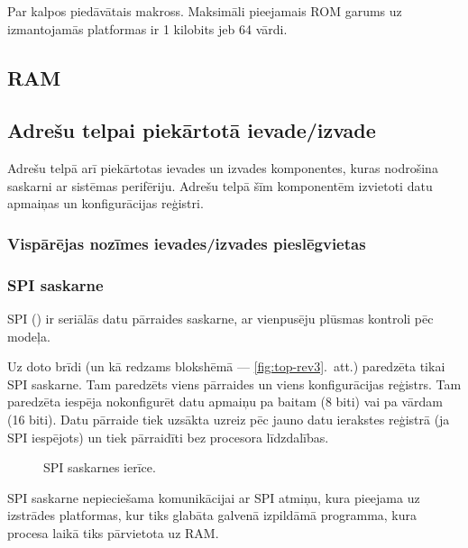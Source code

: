 	Par  kalpos  piedāvātais
	 makross.\cite{FlashROM}
	Maksimāli pieejamais ROM garums uz izmantojamās platformas ir
	1 kilobits jeb 64 vārdi.\cite{FusionGuide}

\subsection{RAM}
	\todo

\subsection{Adrešu telpai piekārtotā ievade/izvade}
	Adrešu telpā arī piekārtotas ievades un izvades komponentes,
	kuras nodrošina saskarni ar sistēmas perifēriju. Adrešu telpā šīm
	komponentēm izvietoti datu apmaiņas un konfigurācijas reģistri.
	
	\subsubsection{Vispārējas nozīmes ievades/izvades pieslēgvietas}
	\todo
	
	\subsubsection{SPI saskarne}
	SPI () ir seriālās
	datu pārraides saskarne, ar vienpusēju plūsmas kontroli pēc
	 modeļa.
	
	
	
	Uz doto brīdi (un kā redzams blokshēmā — \ref{fig:top-rev3}.~att.)
	paredzēta tikai SPI saskarne. Tam paredzēts viens pārraides un viens
	konfigurācijas reģistrs. Tam paredzēta iespēja nokonfigurēt datu
	apmaiņu pa baitam (8 biti) vai pa vārdam (16 biti). Datu pārraide tiek
	uzsākta uzreiz pēc jauno datu ierakstes reģistrā (ja SPI iespējots) un
	tiek pārraidīti bez procesora līdzdalības.
	
	\begin{figure}[thp]
		\centering
		\def\svgscale{1.25}
		{\ttfamily\scriptsize}
		\caption{SPI saskarnes ierīce.}
		\label{fig:spi}
	\end{figure}
	
	SPI saskarne nepieciešama komunikācijai ar SPI  atmiņu,
	kura pieejama uz izstrādes platformas,\cite[43.~lpp.]{FusionGuide}
	kur tiks glabāta galvenā izpildāmā programma, kura  procesa
	laikā tiks pārvietota uz RAM.
